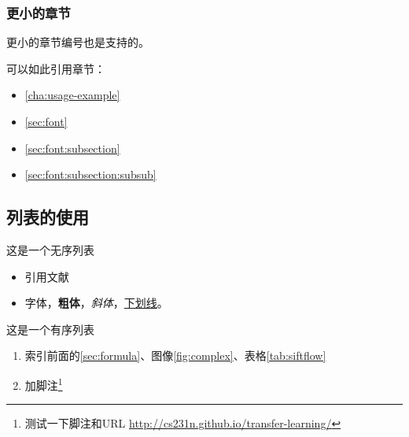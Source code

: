 \subsubsection{更小的章节}
\label{sec:font:subsection:subsub}
更小的章节编号也是支持的。

可以如此引用章节：

\begin{itemize}
    \item \autoref{cha:usage-example}
    \item  \autoref{sec:font}
    \item  \autoref{sec:font:subsection}
    \item  \autoref{sec:font:subsection:subsub}
\end{itemize}


\subsection{列表的使用}
\label{sec:font:list}

这是一个无序列表
\begin{itemize}
    \item 引用文献\cite{long2015fully}
    \item 字体{\color{red}{变红}}，\textbf{粗体}，\textit{斜体}，\underline{下划线}。
\end{itemize}

这是一个有序列表
\begin{enumerate}
    \item 索引前面的\autoref{sec:formula}、图像\ref{fig:complex}、表格\ref{tab:siftflow}
    \item 加脚注\footnote{测{试一下}脚注和URL \url{http://cs231n.github.io/transfer-learning/}}
\end{enumerate}


